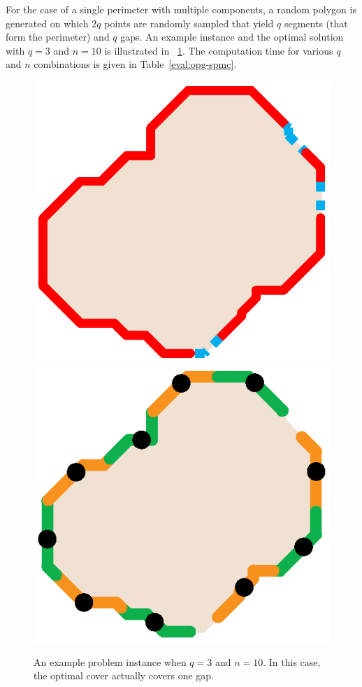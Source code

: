 For the case of a single perimeter with multiple components, a random 
polygon is generated on which $2q$ points are randomly sampled that 
yield $q$ segments (that form the perimeter) and $q$ gaps. An example 
instance and the optimal solution with $q=3$ and $n = 10$ is illustrated 
in ~\ref{fig:opg-spmc-example}. The computation time for various $q$ and 
$n$ combinations is given in Table~\ref{eval:opg-spmc}.
\begin{figure}[ht!]
    \centering
    \includegraphics[keepaspectratio, scale=0.4]{./chapters/opg/figures/spmc-example.eps}
    \includegraphics[keepaspectratio, scale=0.4]{./chapters/opg/figures/spmc-solution.eps}
    \caption{\label{fig:opg-spmc-example} 
    An example problem instance when $q = 3$ and $n = 10$. In this case, the 
		optimal cover actually covers one gap.}
\end{figure}

